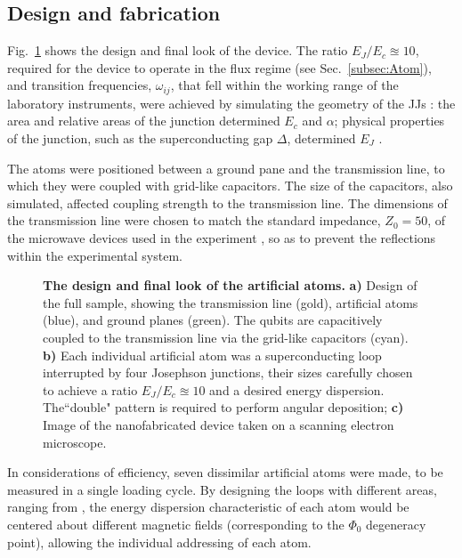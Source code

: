  \subsection{Design and fabrication\label{subsec:Design}}
 Fig.~\ref{designDesign} shows the design and final look of the device. The ratio $ E_J/E_c \approxeq 10 $, required for the device to operate in the flux regime (see Sec.~\ref{subsec:Atom}), and transition frequencies, $ \omega_{ij} $, that fell within the working range of the laboratory instruments, were achieved by simulating the geometry of the JJs \cite{Strongcouplingofasinglephotontoasuperconductingqubitusingcircuitquantumelectrodynamics}: the area and relative areas of the junction determined $ E_c $ and $ \alpha $; physical properties of the junction, such as the superconducting gap $ \Delta $, determined $ E_J $ \cite{tunnelingBetweenSuperconductors}.
 
 The atoms were positioned between a ground pane and the transmission line, to which they were coupled with grid-like capacitors. The size of the capacitors, also simulated, affected coupling strength to the transmission line. The dimensions of the transmission line were chosen to match the standard impedance, $ {Z}_0 = 50 $, of the microwave devices used in the experiment \cite{ioChunHoi}, so as to prevent the reflections within the experimental system.

  \begin{figure}
  	\caption{\small\textbf{The design and final look of the artificial atoms.} \textbf{a)} Design of the full sample, showing the transmission line (gold), artificial atoms (blue), and ground planes (green). The qubits are capacitively coupled to the transmission line via the grid-like capacitors (cyan). \textbf{b)} Each individual artificial atom was a superconducting loop interrupted by four Josephson junctions, their sizes carefully chosen to achieve a ratio $ E_J/E_c \approxeq10 $ and a desired energy dispersion. The``double" pattern is required to perform angular deposition; \textbf{c)} Image of the nanofabricated device taken on a scanning electron microscope.}
  	\label{designDesign}
  \end{figure}
 
 In considerations of efficiency, seven dissimilar artificial atoms were made, to be measured in a single loading cycle. By designing the loops with different areas, ranging from , the energy dispersion characteristic of each atom would be centered about different magnetic fields (corresponding to the $ \Phi_0 $ degeneracy point), allowing the individual addressing of each atom.
   
